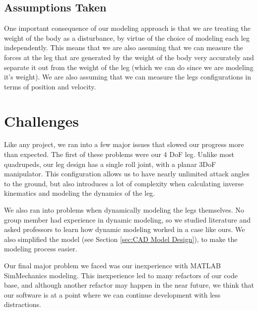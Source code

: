 \documentclass[letterpaper, 10 pt, conference]{ieeeconf}  %
\begin{document}
\subsection{Assumptions Taken}
One important consequence of our modeling approach is that we are treating the weight of the body as a disturbance, by virtue of the choice of modeling each leg independently. This means that we are also assuming that we can measure the forces at the leg that are generated by the weight of the body very accurately and separate it out from the weight of the leg (which we can do since we are modeling it's weight).
We are also assuming that we can measure the legs configurations in terms of position and velocity.


\section{Challenges}
Like any project, we ran into a few major issues that slowed our progress more than expected. The first of these problems were our 4 DoF leg. Unlike most quadrupeds, our leg design has a single roll joint, with a planar 3DoF manipulator. This configuration allows us to have nearly unlimited attack angles to the ground, but also introduces a lot of complexity when calculating inverse kinematics and modeling the dynamics of the leg.

We also ran into problems when dynamically modeling the legs themselves. No group member had experience in dynamic modeling, so we studied literature and asked professors to learn how dynamic modeling worked in a case like ours. We also simplified the model (see Section \ref{sec:CAD Model Design}), to make the modeling process easier.

Our final major problem we faced was our inexperience with MATLAB SimMechanics modeling. This inexperience led to many refactors of our code base, and although another refactor may happen in the near future, we think that our software is at a point where we can continue development with less distractions.
\end{document}
